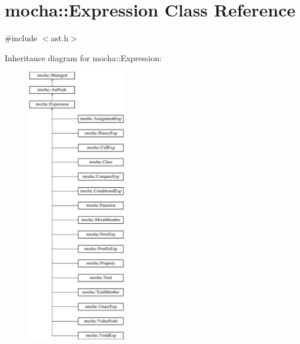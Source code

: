 \hypertarget{classmocha_1_1_expression}{
\section{mocha::Expression Class Reference}
\label{classmocha_1_1_expression}
}


{\ttfamily \#include $<$ast.h$>$}

Inheritance diagram for mocha::Expression:\begin{figure}[H]
\begin{center}
\leavevmode
\includegraphics[height=12.000000cm]{classmocha_1_1_expression}
\end{center}
\end{figure}

